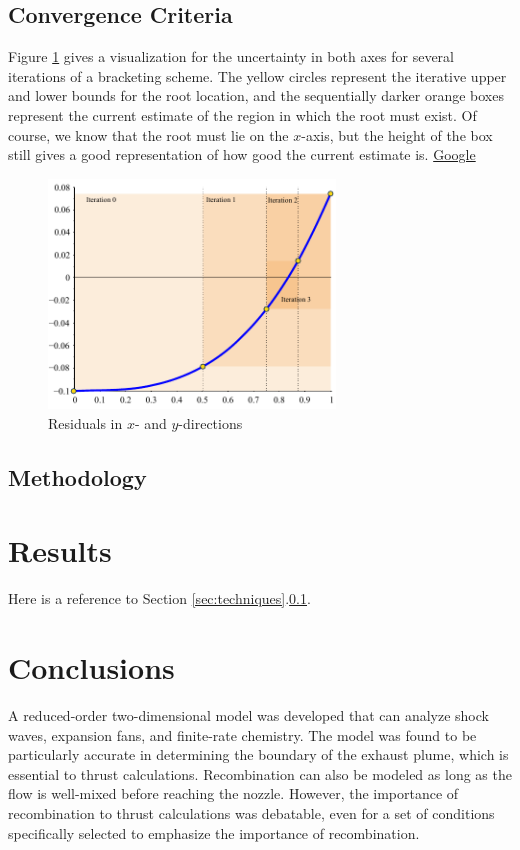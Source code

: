 \documentclass[journal,backrefs]{../aiaa-pretty}
\begin{document}
\subsection{Convergence Criteria} \label{ssec:criteria}
Figure \ref{fig:f:tol} gives a visualization for the uncertainty in both axes for several iterations of a bracketing scheme.  The yellow circles represent the iterative upper and lower bounds for the root location, and the sequentially darker orange boxes represent the current estimate of the region in which the root must exist.  Of course, we know that the root must lie on the $x$-axis, but the height of the box still gives a good representation of how good the current estimate is.  \href{http://www.google.com}{Google}

\begin{figure}
 \centering
 \includegraphics[width=3in]{./pics/f1_tol.pdf}
 \caption{ \label{fig:f:tol}
  Residuals in $x$- and $y$-directions}
\end{figure}


\subsection{Methodology}



\section{Results}
Here is a reference to Section \ref{sec:techniques}.\ref{ssec:criteria}.


\section{Conclusions}                            \label{sec:conclusion}
A reduced-order two-dimensional model was developed that can analyze shock waves, expansion fans, and finite-rate chemistry.  The model was found to be particularly accurate in determining the boundary of the exhaust plume, which is essential to thrust calculations.  Recombination can also be modeled as long as the flow is well-mixed before reaching the nozzle.  However, the importance of recombination to thrust calculations was debatable, even for a set of conditions specifically selected to emphasize the importance of recombination.
\end{document}
